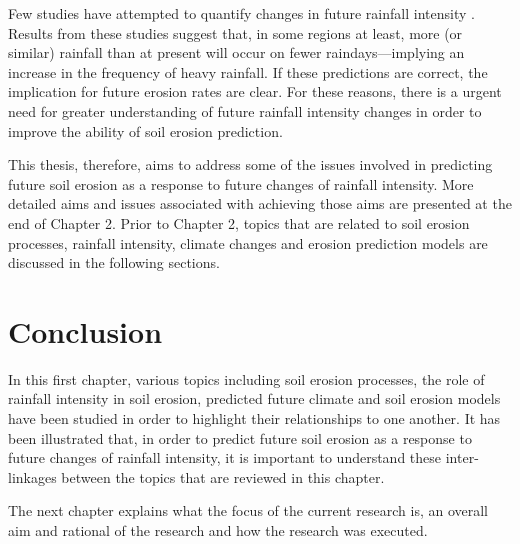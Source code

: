 Few studies have attempted to quantify changes in future rainfall intensity
\citep{karl1995-217,houghton1996-climate,watson1998-517,karl1998-231,
osborn1998-505,osborn2002-1313,osborn2008-changing}. Results from these studies
suggest that, in some regions at least, more (or similar) rainfall than at
present will occur on fewer raindays---implying an increase in the frequency of
heavy rainfall. If these predictions are correct, the implication for future
erosion rates are clear. For these reasons, there is a urgent need for greater
understanding of future rainfall intensity changes in order to improve the
ability of soil erosion prediction.

This thesis, therefore, aims to address some of the issues involved in
predicting future soil erosion as a response to future changes of rainfall
intensity. More detailed aims and issues associated with achieving those aims
are presented at the end of Chapter 2. Prior to Chapter 2, topics that are
related to soil erosion processes, rainfall intensity, climate changes and
erosion prediction models are discussed in the following sections.






\section{Conclusion}
In this first chapter, various topics including soil erosion processes,
the role of rainfall intensity in soil erosion, predicted future climate
and soil erosion models have been studied in order to highlight their
relationships to one another. It has been illustrated that, in order to
predict future soil erosion as a response to future changes of rainfall
intensity, it is important to understand these inter-linkages between the
topics that are reviewed in this chapter.

The next chapter explains what the focus of the current research is, an overall
aim and rational of the research and how the research was executed.


